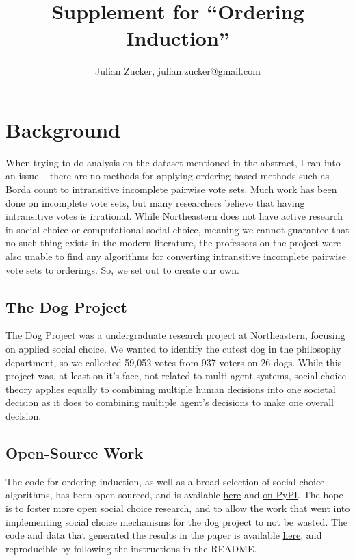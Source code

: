 \documentclass{article}
\title{Supplement for ``Ordering Induction''}
\author{Julian Zucker, julian.zucker@gmail.com}
\date{}
\begin{document}
\maketitle

\section{Background}
When trying to do analysis on the dataset mentioned in the abstract, I ran into an issue -- there are no methods for applying ordering-based methods such as Borda count to intransitive incomplete pairwise vote sets. Much work has been done on incomplete vote sets, but many researchers believe that having intransitive votes is irrational. While Northeastern does not have active research in social choice or computational social choice, meaning we cannot guarantee that no such thing exists in the modern literature, the professors on the project were also unable to find any algorithms for converting intransitive incomplete pairwise vote sets to orderings. So, we set out to create our own.

\subsection{The Dog Project}
The Dog Project was a undergraduate research project at Northeastern, focusing on applied social choice. We wanted to identify the cutest dog in the philosophy department, so we collected 59,052 votes from 937 voters on 26 dogs. While this project was, at least on it's face, not related to multi-agent systems, social choice theory applies equally to combining multiple human decisions into one societal decision as it does to combining multiple agent's decisions to make one overall decision.

\subsection{Open-Source Work} 
The code for ordering induction, as well as a broad selection of social choice algorithms, has been open-sourced, and is available \href{https://github.com/julian-zucker/socialchoice}{here} and \href{https://pypi.org/project/socialchoice/}{on PyPI}. The hope is to foster more open social choice research, and to allow the work that went into implementing social choice mechanisms for the dog project to not be wasted. The code and data that generated the results in the paper is available \href{https://github.com/julian-zucker/vote-induction}{here}, and reproducible by following the instructions in the README.
 
\end{document}
